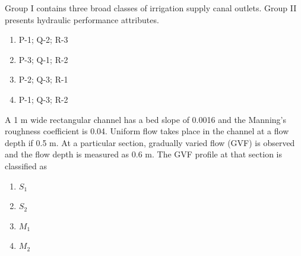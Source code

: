 \item Group I contains three broad classes of irrigation supply canal outlets. Group II presents hydraulic performance attributes.
\begin{table}[H]
    \centering
    \label{tab:my_label}
\end{table}

\begin{multicols}{2}
    \begin{enumerate}
        \item P-1; Q-2; R-3
        \item P-3; Q-1; R-2
        \item P-2; Q-3; R-1
        \item P-1; Q-3; R-2
    \end{enumerate}
\end{multicols}

\item A 1 m wide rectangular channel has a bed slope of 0.0016 and the Manning's roughness coefficient is 0.04. Uniform flow takes place in the channel at a flow depth if 0.5 m. At a particular section, gradually varied flow (GVF) is observed and the flow depth is measured as 0.6 m. The GVF profile at that section is classified as
\begin{multicols}{2}
    \begin{enumerate}
        \item $S_1$
        \item $S_2$
        \item $M_1$
        \item $M_2$
    \end{enumerate}
\end{multicols}

